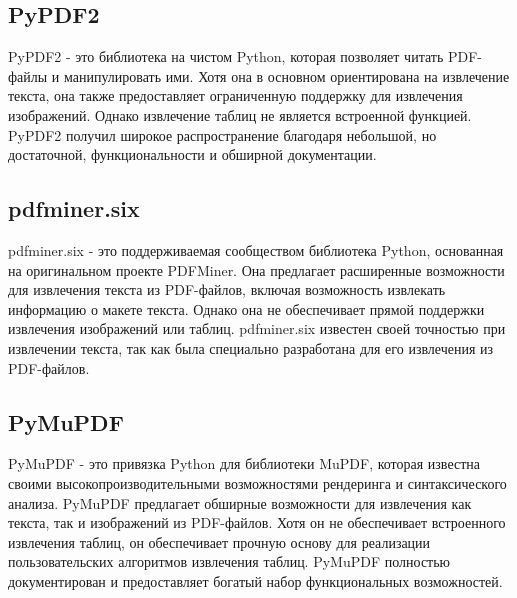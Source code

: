 \subsection{PyPDF2}
PyPDF2 - это библиотека на чистом Python, которая позволяет читать PDF-файлы и манипулировать ими. Хотя она в основном ориентирована на извлечение текста, она также предоставляет ограниченную поддержку для извлечения изображений. Однако извлечение таблиц не является встроенной функцией. PyPDF2 получил широкое распространение благодаря небольшой, но достаточной, функциональности и обширной документации.
\subsection{pdfminer.six}
pdfminer.six - это поддерживаемая сообществом библиотека Python, основанная на оригинальном проекте PDFMiner. Она предлагает расширенные возможности для извлечения текста из PDF-файлов, включая возможность извлекать информацию о макете текста. Однако она не обеспечивает прямой поддержки извлечения изображений или таблиц. pdfminer.six известен своей точностью при извлечении текста, так как была специально разработана для его извлечения из PDF-файлов.
\subsection{PyMuPDF}
PyMuPDF - это привязка Python для библиотеки MuPDF, которая известна своими высокопроизводительными возможностями рендеринга и синтаксического анализа. PyMuPDF предлагает обширные возможности для извлечения как текста, так и изображений из PDF-файлов. Хотя он не обеспечивает встроенного извлечения таблиц, он обеспечивает прочную основу для реализации пользовательских алгоритмов извлечения таблиц. PyMuPDF полностью документирован и предоставляет богатый набор функциональных возможностей.

